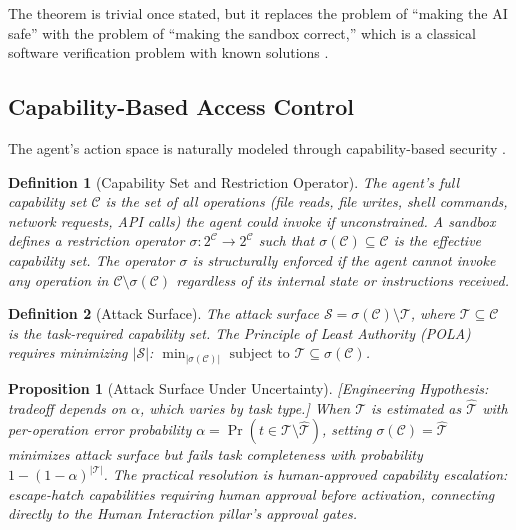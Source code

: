 \documentclass[11pt, a4paper]{googledeepmind}
\newtheorem{definition}{Definition}[section]
\newtheorem{proposition}{Proposition}[section]
\begin{document}
The theorem is trivial once stated, but it replaces the problem of ``making the AI safe'' with the problem of ``making the sandbox correct,'' which is a classical software verification problem with known solutions \citep{klein2009sel4}.

\subsection{Capability-Based Access Control}

The agent's action space is naturally modeled through capability-based security \citep{dennis1966programming, miller2003myths}.

\begin{definition}[Capability Set and Restriction Operator]
\label{def:capability-sec}
The agent's full capability set $\mathcal{C}$ is the set of all operations (file reads, file writes, shell commands, network requests, API calls) the agent could invoke if unconstrained. A sandbox defines a restriction operator $\sigma: 2^{\mathcal{C}} \to 2^{\mathcal{C}}$ such that $\sigma(\mathcal{C}) \subseteq \mathcal{C}$ is the effective capability set. The operator $\sigma$ is \emph{structurally enforced} if the agent cannot invoke any operation in $\mathcal{C} \setminus \sigma(\mathcal{C})$ regardless of its internal state or instructions received.
\end{definition}

\begin{definition}[Attack Surface]
\label{def:attack-surface-sec}
The attack surface $\mathcal{S} = \sigma(\mathcal{C}) \setminus \mathcal{T}$, where $\mathcal{T} \subseteq \mathcal{C}$ is the task-required capability set. The Principle of Least Authority (POLA) \citep{saltzer1975protection} requires minimizing $|\mathcal{S}|$: $\min_{|\sigma(\mathcal{C})|} \text{ subject to } \mathcal{T} \subseteq \sigma(\mathcal{C})$.
\end{definition}

\begin{proposition}[Attack Surface Under Uncertainty]
\emph{[Engineering Hypothesis: tradeoff depends on $\alpha$, which varies by task type.]}
\label{prop:attack-surface-sec}
When $\mathcal{T}$ is estimated as $\hat{\mathcal{T}}$ with per-operation error probability $\alpha = \Pr(t \in \mathcal{T} \setminus \hat{\mathcal{T}})$, setting $\sigma(\mathcal{C}) = \hat{\mathcal{T}}$ minimizes attack surface but fails task completeness with probability $1 - (1-\alpha)^{|\mathcal{T}|}$. The practical resolution is human-approved capability escalation: escape-hatch capabilities requiring human approval before activation, connecting directly to the Human Interaction pillar's approval gates.
\end{proposition}
\end{document}
